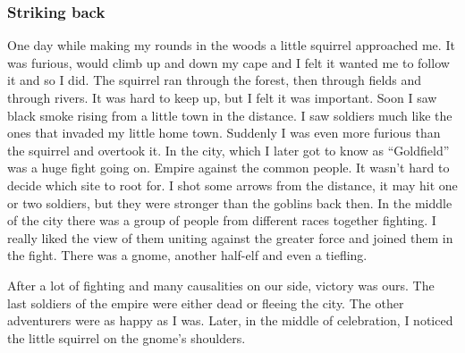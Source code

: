 \documentclass[letterpaper,10pt,twoside,twocolumn,openany]{book}
\begin{document}
	\subsubsection{Striking back}
	One day while making my rounds in the woods a little squirrel approached me. It was furious, would climb up and down my cape and I felt it wanted me to follow it and so I did. The squirrel ran through the forest, then through fields and through rivers. It was hard to keep up, but I felt it was important. Soon I saw black smoke rising from a little town in the distance. I saw soldiers much like the ones that invaded my little home town. Suddenly I was even more furious than the squirrel and overtook it. In the city, which I later got to know as “Goldfield” was a huge fight going on. Empire against the common people. It wasn’t hard to decide which site to root for. I shot some arrows from the distance, it may hit one or two soldiers, but they were stronger than the goblins back then. In the middle of the city there was a group of people from different races together fighting. I really liked the view of them uniting against the greater force and joined them in the fight. There was a gnome, another half-elf and even a tiefling. 
	
	After a lot of fighting and many causalities on our side, victory was ours. The last soldiers of the empire were either dead or fleeing the city. The other adventurers were as happy as I was. Later, in the middle of celebration, I noticed the little squirrel on the gnome’s shoulders. 
	
	
\end{document}
